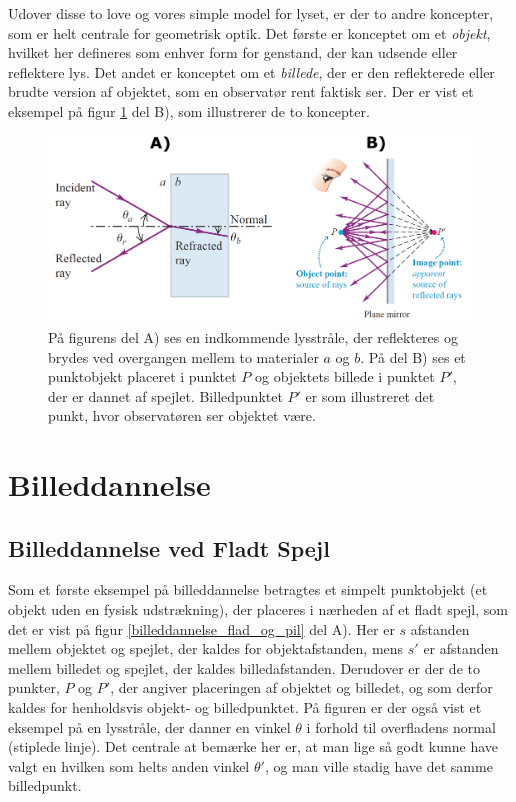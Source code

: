 Udover disse to love og vores simple model for lyset, er der to andre koncepter, som er helt centrale for geometrisk optik. Det første er konceptet om et \textit{objekt}, hvilket her defineres som enhver form for genstand, der kan udsende eller reflektere lys. Det andet er konceptet om et \textit{billede}, der er den reflekterede eller brudte version af objektet, som en observatør rent faktisk ser. Der er vist et eksempel på figur \ref{ind_ud_og_obj_img_def} del B), som illustrerer de to koncepter.
\begin{figure}[h!]
	\centering
	\includegraphics[scale=0.22]{Geometrisk-Optik/ind_ud_og_obj_img_def.PNG}
	\caption{På figurens del A) ses en indkommende lysstråle, der reflekteres og brydes ved overgangen mellem to materialer $a$ og $b$. På del B) ses et punktobjekt placeret i punktet $P$ og objektets billede i punktet $P'$, der er dannet af spejlet. Billedpunktet $P'$ er som illustreret det punkt, hvor observatøren ser objektet være.}
	\label{ind_ud_og_obj_img_def}
\end{figure}

\section{Billeddannelse}

\subsection*{Billeddannelse ved Fladt Spejl}

Som et første eksempel på billeddannelse betragtes et simpelt punktobjekt (et objekt uden en fysisk udstrækning), der placeres i nærheden af et fladt spejl, som det er vist på figur \ref{billeddannelse_flad_og_pil} del A). Her er $s$ afstanden mellem objektet og spejlet, der kaldes for objektafstanden, mens $s'$ er afstanden mellem billedet og spejlet, der kaldes billedafstanden. Derudover er der de to punkter, $P$ og $P'$, der angiver placeringen af objektet og billedet, og som derfor kaldes for henholdsvis objekt- og billedpunktet. På figuren er der også vist et eksempel på en lysstråle, der danner en vinkel $\theta$ i forhold til overfladens normal (stiplede linje). Det centrale at bemærke her er, at man lige så godt kunne have valgt en hvilken som helts anden vinkel $\theta'$, og man ville stadig have det samme billedpunkt.\\  

